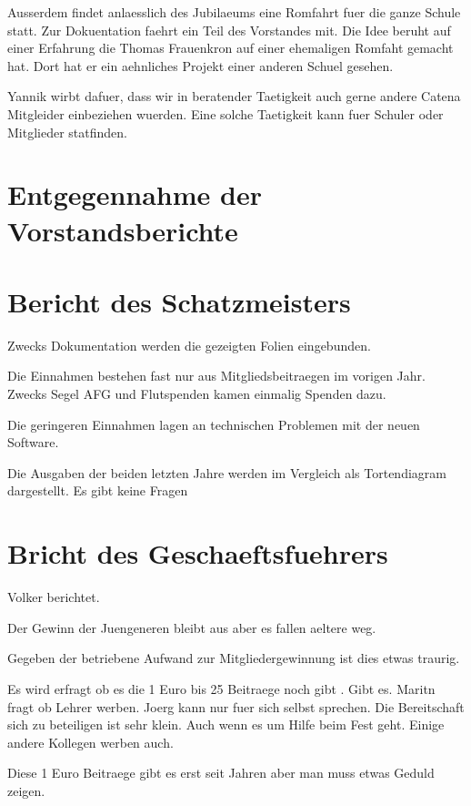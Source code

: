 \documentclass[a4paper, 11pt]{article}
\begin{document}
Ausserdem findet anlaesslich des Jubilaeums eine Romfahrt fuer die ganze Schule statt.
Zur Dokuentation faehrt ein Teil des Vorstandes mit.
Die Idee beruht auf einer Erfahrung die Thomas Frauenkron auf einer ehemaligen Romfaht gemacht hat.
Dort hat er ein aehnliches Projekt einer anderen Schuel gesehen.

Yannik wirbt dafuer, dass wir in beratender Taetigkeit auch gerne andere Catena Mitgleider einbeziehen wuerden.
Eine solche Taetigkeit kann fuer Schuler oder Mitglieder statfinden.



\section*{Entgegennahme der Vorstandsberichte}



\section*{Bericht des Schatzmeisters}

Zwecks Dokumentation werden die gezeigten Folien eingebunden.

Die Einnahmen bestehen fast nur aus Mitgliedsbeitraegen im vorigen Jahr.
Zwecks Segel AFG und Flutspenden kamen einmalig Spenden dazu.

Die geringeren Einnahmen lagen an technischen Problemen mit der neuen Software.


Die Ausgaben der beiden letzten Jahre werden im Vergleich als Tortendiagram dargestellt.
Es gibt keine Fragen


\section*{Bricht des Geschaeftsfuehrers}

Volker berichtet.

Der Gewinn der Juengeneren bleibt aus aber es fallen aeltere weg.

Gegeben der betriebene Aufwand zur Mitgliedergewinnung ist dies etwas traurig.

Es wird erfragt ob es die 1 Euro bis 25 Beitraege noch gibt . Gibt es.
Maritn fragt ob Lehrer werben.
Joerg kann nur fuer sich selbst sprechen.
Die Bereitschaft sich zu beteiligen ist sehr klein. Auch wenn es um Hilfe beim Fest geht.
Einige andere Kollegen werben auch.

Diese 1 Euro Beitraege gibt es erst seit  Jahren aber man muss etwas Geduld zeigen.
\end{document}
